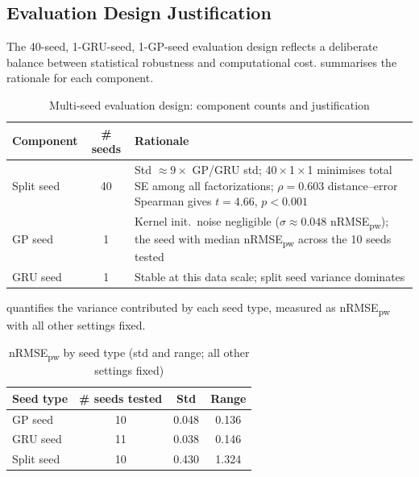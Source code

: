 \subsection{Evaluation Design Justification}
\label{sec:seed_design}

The 40-seed, 1-GRU-seed, 1-GP-seed evaluation design reflects a deliberate balance
between statistical robustness and computational cost.
 summarises the rationale for each component.

\begin{table}[htbp]
\centering
\begin{tabularx}{\linewidth}{lcX}
\toprule
\textbf{Component} & \textbf{\# seeds} & \textbf{Rationale} \\
\midrule
Split seed & 40 & Std $\approx 9{\times}$ GP/GRU std; 40\,$\times$\,1\,$\times$\,1 minimises total SE
  among all factorizations; $\rho = 0.603$ distance--error Spearman gives $t = 4.66$,
  $p < 0.001$ \\
GP seed    & 1  & Kernel init.\ noise negligible ($\sigma \approx 0.048$
  nRMSE\textsubscript{pw}); the seed with median nRMSE\textsubscript{pw} across the
  10 seeds tested \\
GRU seed   & 1  & Stable at this data scale; split seed variance dominates \\
\bottomrule
\end{tabularx}
\caption{Multi-seed evaluation design: component counts and justification}
\label{tab:seed_design}
\end{table}

 quantifies the variance contributed by each seed type,
measured as nRMSE\textsubscript{pw} with all other settings fixed.

\begin{table}[htbp]
\centering
\begin{tabular}{lccc}
\toprule
\textbf{Seed type} & \textbf{\# seeds tested} & \textbf{Std} & \textbf{Range} \\
\midrule
GP seed    & 10 & 0.048 & 0.136 \\
GRU seed   & 11 & 0.038 & 0.146 \\
Split seed & 10 & 0.430 & 1.324 \\
\bottomrule
\end{tabular}
\caption{nRMSE\textsubscript{pw} by seed type (std and range; all other settings fixed)}
\label{tab:seed_variance}
\end{table}

